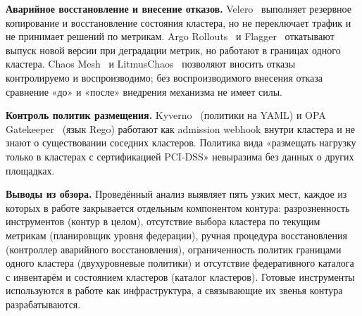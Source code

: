 \textbf{Аварийное восстановление и внесение отказов.} Velero~\cite{velero}
выполняет резервное копирование и восстановление состояния кластера, но не
переключает трафик и не принимает решений по метрикам. Argo
Rollouts~\cite{argo-rollouts} и Flagger~\cite{flagger} откатывают выпуск новой
версии при деградации метрик, но работают в границах одного кластера.
Chaos Mesh~\cite{chaos-mesh} и LitmusChaos~\cite{litmus} позволяют вносить
отказы контролируемо и воспроизводимо; без воспроизводимого внесения отказа
сравнение «до» и «после» внедрения механизма не имеет силы.

\textbf{Контроль политик размещения.} Kyverno~\cite{kyverno} (политики на
YAML) и OPA Gatekeeper~\cite{gatekeeper} (язык Rego) работают как admission
webhook внутри кластера и не знают о существовании соседних кластеров.
Политика вида «размещать нагрузку только в кластерах с сертификацией
PCI-DSS» невыразима без данных о других площадках.


\textbf{Выводы из обзора.} Проведённый анализ выявляет пять узких мест,
каждое из которых в работе закрывается отдельным компонентом контура:
разрозненность инструментов (контур в целом), отсутствие выбора кластера по
текущим метрикам (планировщик уровня федерации), ручная процедура
восстановления (контроллер аварийного восстановления), ограниченность
политик границами одного кластера (двухуровневые политики) и отсутствие
федеративного каталога с инвентарём и состоянием кластеров (каталог
кластеров). Готовые инструменты используются в работе как инфраструктура, а
связывающие их звенья контура разрабатываются.
